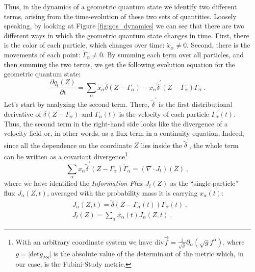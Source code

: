 \documentclass[draft,nofootinbib,pre,twocolumn,showpacs,showkeys,preprintnumbers,floatfix]{revtex4-1}
\newcommand{\1}{\mathbbm{1}}
\begin{document}
Thus, in the dynamics of a geometric quantum state we identify two different terms, arising from the 
time-evolution of these two sets of quantities. Loosely speaking, by looking at Figure \ref{fig:gqs_dynamics}
we can see that there are two different ways in which the geometric quantum state changes 
in time. First, there is the color of each particle, which changes over time: $\dot{x}_\alpha \neq 0$. Second, there is
the movements of each point: $\dot{\Gamma}_\alpha \neq 0$. By summing each term over
all particles, and then summing the two terms, we get the following evolution equation for the geometric quantum state:
\begin{equation}
\frac{\partial q_t(Z)}{\partial t} = \sum_\alpha \dot{x}_\alpha \tilde{\delta}\left( Z- \Gamma_\alpha \right) - x_\alpha \widetilde{\delta}^{'}\left(Z - \Gamma_\alpha \right) \dot{\Gamma}_{\alpha}~.\label{eq:cont}
\end{equation}
Let's start by analyzing the second term. There, $\widetilde{\delta}^{'}$ is the first distributional derivative 
of $\widetilde{\delta}(Z-\Gamma_\alpha)$ and $\Gamma_\alpha(t)$ is the velocity of each particle $\Gamma_\alpha(t)$.
Thus, the second term in the right-hand side looks like the divergence of a velocity field or, in other words, as a flux
term in a continuity equation. Indeed, since all the dependence on the coordinate $Z$ lies inside the $\widetilde{\delta}^{'}$, 
the whole term can be written as a covariant divergence\footnote{With an arbitrary coordinate system we have 
$\mathrm{div} \vec{f} = \frac{1}{\sqrt{g}} \partial_\alpha \left(\sqrt{g} f^\alpha\right)$,
where $g = \vert \mathrm{det} g_{FS}\vert$ is the absolute value of the determinant of the metric which, 
in our case, is the Fubini-Study metric.}
\begin{equation}
\sum_\alpha x_\alpha \widetilde{\delta}^{'}\left(Z - \Gamma_\alpha \right) \dot{\Gamma}_{\alpha} = (\nabla \cdot J_t)(Z)~,
\end{equation}
where we have identified the \emph{Information Flux} $J_t(Z)$ as the ``single-particle'' flux $J_\alpha(Z,t)$, averaged
with the probability mass it is carrying $x_\alpha(t)$:
\begin{subequations}\label{eq:flux}
\begin{align}
&J_\alpha(Z,t) =  \widetilde{\delta}\left(Z - \Gamma_\alpha(t) \right) \dot{\Gamma}_{\alpha}(t)~,\\
&J_t(Z) = \sum_\alpha x_\alpha(t)J_\alpha(Z,t)~.
\end{align}
\end{subequations}
\end{document}
